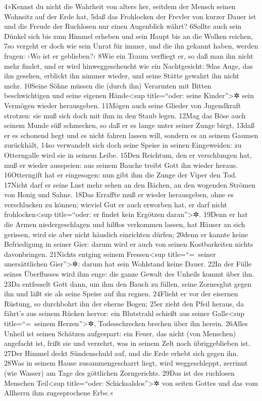 4»Kennst du nicht die Wahrheit von alters her, seitdem der Mensch seinen
Wohnsitz auf der Erde hat, 5daß das Frohlocken der Frevler von kurzer
Dauer ist und die Freude der Ruchlosen nur einen Augenblick währt?
6Sollte auch sein Dünkel sich bis zum Himmel erheben und sein Haupt bis
an die Wolken reichen, 7so vergeht er doch wie sein Unrat für immer, und
die ihn gekannt haben, werden fragen: ›Wo ist er geblieben?‹ 8Wie ein
Traum verfliegt er, so daß man ihn nicht mehr findet, und er wird
hinweggescheucht wie ein Nachtgesicht: 9das Auge, das ihn gesehen,
erblickt ihn nimmer wieder, und seine Stätte gewahrt ihn nicht mehr.
10Seine Söhne müssen die (durch ihn) Verarmten mit Bitten beschwichtigen
und seine eigenen Hände\textless sup title=``oder: seine
Kinder''\textgreater✲ sein Vermögen wieder herausgeben. 11Mögen auch
seine Glieder von Jugendkraft strotzen: sie muß sich doch mit ihm in den
Staub legen. 12Mag das Böse auch seinem Munde süß schmecken, so daß er
es lange unter seiner Zunge birgt, 13daß er es schonend hegt und es
nicht fahren lassen will, sondern es an seinem Gaumen zurückhält, 14so
verwandelt sich doch seine Speise in seinen Eingeweiden: zu Otterngalle
wird sie in seinem Leibe. 15Den Reichtum, den er verschlungen hat, muß
er wieder ausspeien: aus seinem Bauche treibt Gott ihn wieder heraus.
16Otterngift hat er eingesogen: nun gibt ihm die Zunge der Viper den
Tod. 17Nicht darf er seine Lust mehr sehen an den Bächen, an den
wogenden Strömen von Honig und Sahne. 18Das Erraffte muß er wieder
herausgeben, ohne es verschlucken zu können; wieviel Gut er auch
erworben hat, er darf nicht frohlocken\textless sup title=``oder: er
findet kein Ergötzen daran''\textgreater✲. 19Denn er hat die Armen
niedergeschlagen und hilflos verkommen lassen, hat Häuser an sich
gerissen, wird sie aber nicht häuslich einrichten dürfen; 20denn er
kannte keine Befriedigung in seiner Gier: darum wird er auch von seinen
Kostbarkeiten nichts davonbringen. 21Nichts entging seinem
Fressen\textless sup title=``=~seiner unersättlichen
Gier''\textgreater✲: darum hat sein Wohlstand keine Dauer. 22In der
Fülle seines Überflusses wird ihm enge: die ganze Gewalt des Unheils
kommt über ihn. 23Da entfesselt Gott dann, um ihm den Bauch zu füllen,
seine Zornesglut gegen ihn und läßt sie als seine Speise auf ihn regnen.
24Flieht er vor der eisernen Rüstung, so durchbohrt ihn der eherne
Bogen; 25er zieht den Pfeil heraus, da fährt's aus seinem Rücken hervor:
ein Blutstrahl schießt aus seiner Galle\textless sup title=``=~seinem
Herzen''\textgreater✲, Todesschrecken brechen über ihn herein. 26Alles
Unheil ist seinen Schätzen aufgespart: ein Feuer, das nicht (von
Menschen) angefacht ist, frißt sie und verzehrt, was in seinem Zelt noch
übriggeblieben ist. 27Der Himmel deckt Sündenschuld auf, und die Erde
erhebt sich gegen ihn. 28Was in seinem Hause zusammengescharrt liegt,
wird weggeschleppt, zerrinnt (wie Wasser) am Tage des göttlichen
Zorngerichts. 29Das ist des ruchlosen Menschen Teil\textless sup
title=``oder: Schicksalslos''\textgreater✲ von seiten Gottes und das vom
Allherrn ihm zugesprochene Erbe.«

